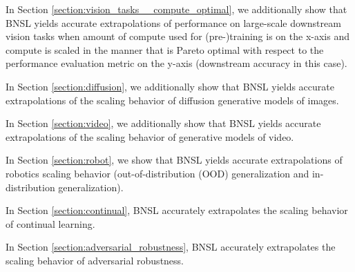\documentclass{article} %
\begin{document}

In Section \ref{section:vision_tasks__compute_optimal}, we additionally show that BNSL yields accurate extrapolations of performance on large-scale downstream vision tasks when amount of compute used for (pre-)training is on the x-axis and compute is scaled in the manner that is Pareto optimal with respect to the performance evaluation metric on the y-axis (downstream accuracy in this case).

\vspace{-2.1mm}

In Section \ref{section:diffusion}, we additionally show that BNSL yields accurate extrapolations of the scaling behavior of diffusion generative models of images.

\vspace{-2.1mm}

In Section \ref{section:video}, we additionally show that BNSL yields accurate extrapolations of the scaling behavior of generative models of video.

\vspace{-2.1mm}

In Section \ref{section:robot}, we show that BNSL yields accurate extrapolations of robotics scaling behavior (out-of-distribution (OOD) generalization and in-distribution generalization).

\vspace{-2.1mm}


In Section \ref{section:continual}, BNSL accurately extrapolates the scaling behavior of continual learning.

\vspace{-2.1mm}

In Section \ref{section:adversarial_robustness}, BNSL accurately extrapolates the scaling behavior of adversarial robustness.

\vspace{-2.1mm}
\end{document}
